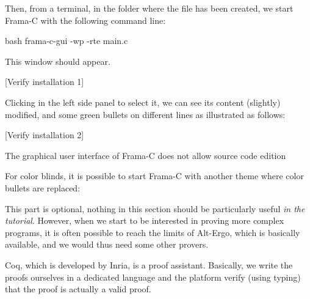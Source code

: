 


Then, from a terminal, in the folder where the file has been created, we
start Frama-C with the following command line:



\begin{CodeBlock}{bash}
frama-c-gui -wp -rte main.c
\end{CodeBlock}



This window should appear.



[Verify installation 1]


Clicking  in the left side panel to select it, we can see
its content (slightly) modified, and some green bullets on different
lines as illustrated as follows:



[Verify installation 2]




\begin{Warning}
  The graphical user interface of Frama-C does not allow source code edition
\end{Warning}


\begin{Information}
  For color blinds, it is possible to start Frama-C with another theme where
  color bullets are replaced:
  
\end{Information}




This part is optional, nothing in this section should be particularly
useful \emph{in the tutorial}. However, when we start to be interested
in proving more complex programs, it is often possible to reach the
limits of Alt-Ergo, which is basically available, and we would thus need
some other provers.





Coq, which is developed by Inria, is a proof assistant. Basically, we
write the proofs ourselves in a dedicated language and the platform
verify (using typing) that the proof is actually a valid proof.



